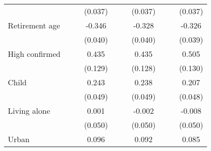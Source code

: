 {\begin{tabular}{l*{9}{c}}
                    &                     &                     &     (0.037)         &                     &                     &     (0.037)         &                     &                     &     (0.037)         \\
\addlinespace
Retirement age      &                     &                     &      -0.346\sym{***}&                     &                     &      -0.328\sym{***}&                     &                     &      -0.326\sym{***}\\
                    &                     &                     &     (0.040)         &                     &                     &     (0.040)         &                     &                     &     (0.039)         \\
\addlinespace
High confirmed      &                     &                     &       0.435\sym{***}&                     &                     &       0.435\sym{***}&                     &                     &       0.505\sym{***}\\
                    &                     &                     &     (0.129)         &                     &                     &     (0.128)         &                     &                     &     (0.130)         \\
\addlinespace
Child               &                     &                     &       0.243\sym{***}&                     &                     &       0.238\sym{***}&                     &                     &       0.207\sym{***}\\
                    &                     &                     &     (0.049)         &                     &                     &     (0.049)         &                     &                     &     (0.048)         \\
\addlinespace
Living alone        &                     &                     &       0.001         &                     &                     &      -0.002         &                     &                     &      -0.008         \\
                    &                     &                     &     (0.050)         &                     &                     &     (0.050)         &                     &                     &     (0.050)         \\
\addlinespace
Urban               &                     &                     &       0.096\sym{**} &                     &                     &       0.092\sym{**} &                     &                     &       0.085\sym{**} \\

\end{tabular}}
